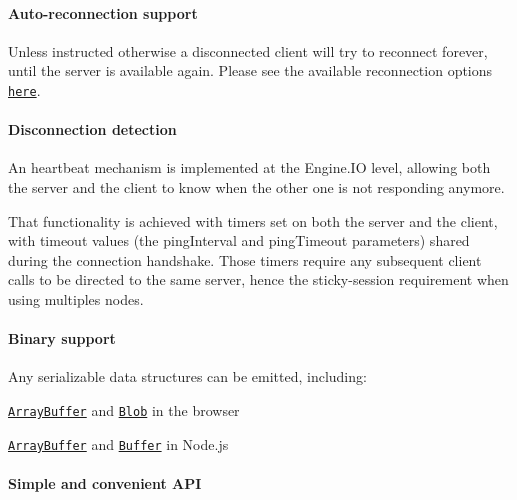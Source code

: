 \paragraph*{Auto-\/reconnection support}

Unless instructed otherwise a disconnected client will try to reconnect forever, until the server is available again. Please see the available reconnection options \href{https://github.com/socketio/socket.io-client/blob/master/docs/API.md#new-managerurl-options}{\tt here}.

\paragraph*{Disconnection detection}

An heartbeat mechanism is implemented at the Engine.\+IO level, allowing both the server and the client to know when the other one is not responding anymore.

That functionality is achieved with timers set on both the server and the client, with timeout values (the {\ttfamily ping\+Interval} and {\ttfamily ping\+Timeout} parameters) shared during the connection handshake. Those timers require any subsequent client calls to be directed to the same server, hence the {\ttfamily sticky-\/session} requirement when using multiples nodes.

\paragraph*{Binary support}

Any serializable data structures can be emitted, including\+:


\begin{DoxyItemize}
\item \href{https://developer.mozilla.org/en-US/docs/Web/JavaScript/Reference/Global_Objects/ArrayBuffer}{\tt Array\+Buffer} and \href{https://developer.mozilla.org/en-US/docs/Web/API/Blob}{\tt Blob} in the browser
\item \href{https://developer.mozilla.org/en-US/docs/Web/JavaScript/Reference/Global_Objects/ArrayBuffer}{\tt Array\+Buffer} and \href{https://nodejs.org/api/buffer.html}{\tt Buffer} in Node.\+js
\end{DoxyItemize}

\paragraph*{Simple and convenient A\+PI}

